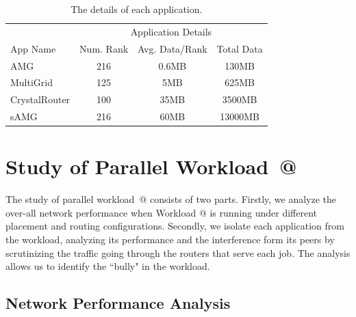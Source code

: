 \documentclass[conference,compsoc]{IEEEtran}
\makeatletter
\newcommand{\Rmnum}[1]{\expandafter\@slowromancap\romannumeral #1@}
\makeatother
\begin{document}

\begin{table}[ht]
\begin{center}
\caption{The details of each application.} 
\label{tab:apps-detail}
\begin{tabular}{l c c c }
\toprule %
\toprule
&\multicolumn{3}{c}{Application Details} \\ 
\cmidrule(l){2-4}
App Name & Num. Rank & Avg. Data/Rank & Total Data\\ %
\midrule %
AMG  &    216 &   0.6MB   &     130MB\\ %
\midrule
MultiGrid  &    125 &   5MB   &     625MB\\ 
\midrule
CrystalRouter  &   100  &  35MB    &     3500MB\\ 
\midrule
sAMG  &    216 &   60MB   &     13000MB\\ %
\midrule %
\bottomrule %
\end{tabular}
\end{center}
\end{table}



\section{Study of Parallel Workload~\Rmnum{1}}
\label{sec:workload-1}
The study of parallel workload~\Rmnum{1} consists of two parts. Firstly, we analyze the over-all network performance when Workload \Rmnum{1} is running under different placement and routing configurations. Secondly, we isolate each application from the workload, analyzing its performance and the interference form its peers by scrutinizing the traffic going through the routers that serve each job. The analysis allows us to identify the ``bully" in the workload. 



\subsection{Network Performance Analysis}
\label{sec: workload-1 network analysis}
\end{document}
